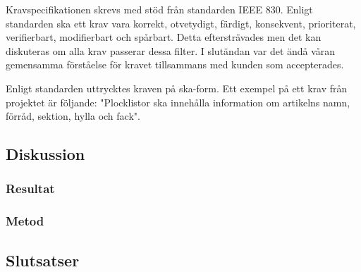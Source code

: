 Kravspecifikationen skrevs med stöd från standarden IEEE 830. Enligt standarden ska ett krav vara korrekt, otvetydigt, färdigt, konsekvent, prioriterat, verifierbart, modifierbart och spårbart. Detta eftersträvades men det kan diskuteras om alla krav passerar dessa filter. I slutändan var det ändå våran gemensamma förståelse för kravet tillsammans med kunden som accepterades. 

Enligt standarden uttrycktes kraven på ska-form. Ett exempel på ett krav från projektet är följande: "Plocklistor ska innehålla information om artikelns namn, förråd, sektion, hylla och fack".
\subsection{Diskussion}
\subsubsection{Resultat}
\subsubsection{Metod}
\subsection{Slutsatser}
